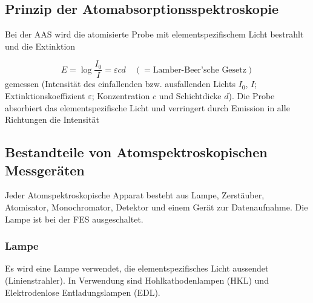   \subsection{Prinzip der Atomabsorptionsspektroskopie}
  
    Bei der AAS wird die atomisierte Probe mit elementspezifischem Licht bestrahlt und die Extinktion  
    
      \begin{equation}
        E = \log \frac{I_0}{I} = \varepsilon c d \quad \left(=\text{Lamber-Beer'sche Gesetz}\right)
      \end{equation}
    gemessen (Intensität des einfallenden bzw. ausfallenden Lichts $I_0$, $I$; Extinktionskoeffizient $\varepsilon$; Konzentration $c$ und Schichtdicke $d$). Die Probe absorbiert das elementspezifische Licht und verringert durch Emission in alle Richtungen die Intensität \citep{Versuchsvorschrift}
    
  \subsection{Bestandteile von Atomspektroskopischen Messgeräten}
    
    Jeder Atomspektroskopische Apparat besteht aus Lampe, Zerstäuber, Atomisator, Monochromator, Detektor und einem Gerät zur Datenaufnahme. Die Lampe ist bei der FES ausgeschaltet. \citep[S. 83]{Taschenatlas}
    
      
    
    \subsubsection{Lampe}
    
      Es wird eine Lampe verwendet, die elementspezifisches Licht aussendet (Linienstrahler). In Verwendung sind Hohlkathodenlampen (HKL) und Elektrodenlose Entladungslampen (EDL).
      
